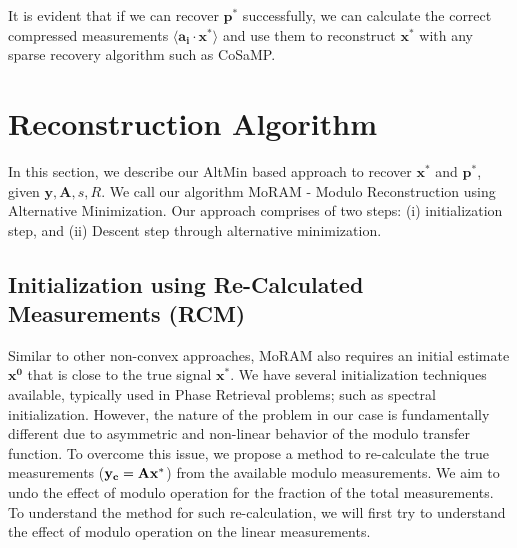 It is evident that if we can recover $\mathbf{p^*}$ successfully, we can calculate the correct compressed measurements $\langle \mathbf{a_i} \cdot \mathbf{x^*} \rangle$ and use them to reconstruct $\mathbf{x^*}$ with any sparse recovery algorithm such as CoSaMP.


\section{Reconstruction Algorithm}

In this section, we describe our AltMin based approach to recover $\mathbf{x^*}$ and $\mathbf{p^*}$, given $\mathbf{y, A}, s, R$. We call our algorithm MoRAM - Modulo Reconstruction using Alternative Minimization. Our approach comprises of two steps: (i) initialization step, and (ii) Descent step through alternative minimization.

\subsection{Initialization using Re-Calculated Measurements (RCM)}
\label{sec:init}
Similar to other non-convex approaches, MoRAM also requires an initial estimate $\mathbf{{x}^0}$ that is close to the true signal $\mathbf{{x}^*}$. We have several initialization techniques available, typically used in Phase Retrieval problems; such as spectral initialization. However, the nature of the problem in our case is fundamentally different due to asymmetric and non-linear behavior of the modulo transfer function. To overcome this issue, we propose a method to re-calculate the true measurements ($\mathbf{y_c}= \mathbf{Ax^*}$) from the available modulo measurements. We aim to undo the effect of modulo operation for the fraction of the total measurements. To understand the method for such re-calculation, we will first try to understand the effect of modulo operation on the linear measurements.

